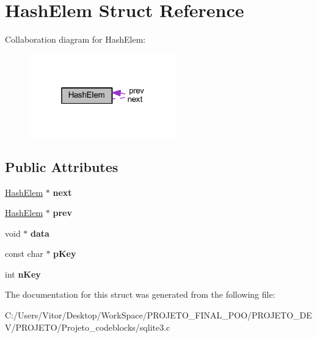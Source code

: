 \hypertarget{struct_hash_elem}{\section{Hash\-Elem Struct Reference}
\label{struct_hash_elem}
}


Collaboration diagram for Hash\-Elem\-:\nopagebreak
\begin{figure}[H]
\begin{center}
\leavevmode
\includegraphics[width=181pt]{struct_hash_elem__coll__graph}
\end{center}
\end{figure}
\subsection*{Public Attributes}
\begin{DoxyCompactItemize}
\item 
\hypertarget{struct_hash_elem_a2d28fad45ff21ffb8a02a7133df860fd}{\hyperlink{struct_hash_elem}{Hash\-Elem} $\ast$ {\bfseries next}}\label{struct_hash_elem_a2d28fad45ff21ffb8a02a7133df860fd}

\item 
\hypertarget{struct_hash_elem_ae4d011c0dc807a3c100ccdb927dd0ba9}{\hyperlink{struct_hash_elem}{Hash\-Elem} $\ast$ {\bfseries prev}}\label{struct_hash_elem_ae4d011c0dc807a3c100ccdb927dd0ba9}

\item 
\hypertarget{struct_hash_elem_ac7e80f63ba2f82457ff68aa0cd360365}{void $\ast$ {\bfseries data}}\label{struct_hash_elem_ac7e80f63ba2f82457ff68aa0cd360365}

\item 
\hypertarget{struct_hash_elem_a9c33a7c8ac467a5547a123338daf61f4}{const char $\ast$ {\bfseries p\-Key}}\label{struct_hash_elem_a9c33a7c8ac467a5547a123338daf61f4}

\item 
\hypertarget{struct_hash_elem_a12c1252e6aa2958f73e2ef969c9a3d81}{int {\bfseries n\-Key}}\label{struct_hash_elem_a12c1252e6aa2958f73e2ef969c9a3d81}

\end{DoxyCompactItemize}


The documentation for this struct was generated from the following file\-:\begin{DoxyCompactItemize}
\item 
C\-:/\-Users/\-Vitor/\-Desktop/\-Work\-Space/\-P\-R\-O\-J\-E\-T\-O\-\_\-\-F\-I\-N\-A\-L\-\_\-\-P\-O\-O/\-P\-R\-O\-J\-E\-T\-O\-\_\-\-D\-E\-V/\-P\-R\-O\-J\-E\-T\-O/\-Projeto\-\_\-codeblocks/sqlite3.\-c\end{DoxyCompactItemize}
